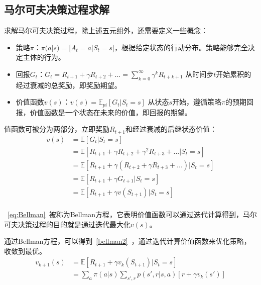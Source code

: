 \subsection{马尔可夫决策过程求解}
求解马尔可夫决策过程，除上述五元组外，还需要定义一些概念：
\begin{itemize}
\item 策略$\pi$：$\pi(a|s)=\mathbb[A_t=a|S_t=s]$，根据给定状态的行动分布。策略能够完全决定主体的行为。
\item 回报$G_t$：$G_t = R_{t+1} + \gamma R_{t+2} + ... = \sum_{k=0}^\infty \gamma^kR_{t+k+1}$ 从时间步$t$开始累积的经过衰减的总奖励，即奖励期望。
\item 价值函数$v(s)$：$v(s)=\mathbb{E}_{pi}[G_t|S_t=s]$ 从状态$s$开始，遵循策略$\pi$的预期回报，价值函数是一个状态在未来的价值，即回报的期望。
\end{itemize}
值函数可被分为两部分，立即奖励$R_{t+1}$和经过衰减的后继状态价值：
\begin{equation}\label{eq:Bellman}
\begin{aligned}
v(s) & = \mathbb{E}[G_t|S_t = s] \\
     & = \mathbb{E}[R_{t+1} + \gamma R_{t+2} + \gamma^2 R_{t+3}+...|S_t=s]\\
     & = \mathbb{E}[R_{t+1} + \gamma(R_{t+2} + \gamma R_{t+3}+...)|S_t=s]\\
     & = \mathbb{E}[R_{t+1} + \gamma G_{t+1}|S_t=s]\\
     & = \mathbb{E}[R_{t+1} + \gamma v(S_{t+1})|S_t=s]\\
\end{aligned}
\end{equation}

~\eqref{eq:Bellman}~被称为Bellman方程\cite{bellman1957markovian}，它表明价值函数可以通过迭代计算得到，马尔可夫决策过程的目的就是通过迭代最大化$v(s)$。

通过Bellman方程，可以得到~\eqref{bellman2}~，通过迭代计算价值函数来优化策略，收敛到最优。
\begin{equation}\label{bellman2}
\begin{aligned}
v_{k+1}(s) &= \mathbb{E}[R_{t+1}+\gamma v_k(S_{t+1})|S_t=s]\\
		   &= \sum_a \pi(a|s) \sum_{s',r}p(s',r|s,a)[r+\gamma v_k(s')]	
\end{aligned}		   
\end{equation}

